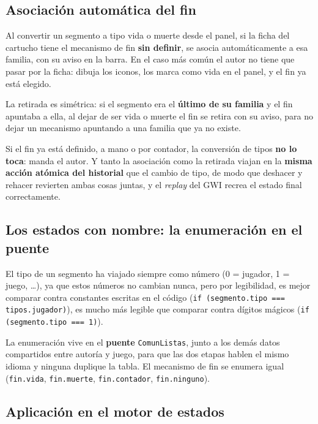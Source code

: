 \subsection{Asociación automática del fin}
\label{subsec:AsociacionFinF3I11}

Al convertir un segmento a tipo vida o muerte desde el panel, si la ficha del
cartucho tiene el mecanismo de fin \textbf{sin definir}, se asocia
automáticamente a esa familia, con su aviso en la barra. En el caso más común
el autor no tiene que pasar por la ficha: dibuja los iconos, los marca como
vida en el panel, y el fin ya está elegido.

La retirada es simétrica: si el segmento era el \textbf{último de su familia} y
el fin apuntaba a ella, al dejar de ser vida o muerte el fin se retira con su
aviso, para no dejar un mecanismo apuntando a una familia que ya no existe.

Si el fin ya está definido, a mano o por contador, la conversión de tipos
\textbf{no lo toca}: manda el autor. Y tanto la asociación como la retirada
viajan en la \textbf{misma acción atómica del historial} que el cambio de
tipo, de modo que deshacer y rehacer revierten ambas cosas juntas, y el
\emph{replay} del GWI recrea el estado final correctamente.

\subsection{Los estados con nombre: la enumeración en el puente}
\label{subsec:EnumeracionF3I11}

El tipo de un segmento ha viajado siempre como número (0 = jugador, 1 = juego,
\dots), ya que estos números no cambian nunca, pero por legibilidad, es mejor comparar contra constantes escritas en el código (\texttt{if (segmento.tipo === tipos.jugador)}), es mucho más
legible que comparar contra dígitos mágicos (\texttt{if (segmento.tipo === 1)}).

La enumeración vive en el \textbf{puente} \texttt{ComunListas}, junto a los demás datos compartidos entre autoría y juego, para que las dos etapas hablen el mismo idioma y ninguna duplique la tabla. El mecanismo de fin se enumera igual (\texttt{fin.vida}, \texttt{fin.muerte}, \texttt{fin.contador}, \texttt{fin.ninguno}).

\subsection{Aplicación en el motor de estados}
\label{subsec:MotorFinF3I11}

